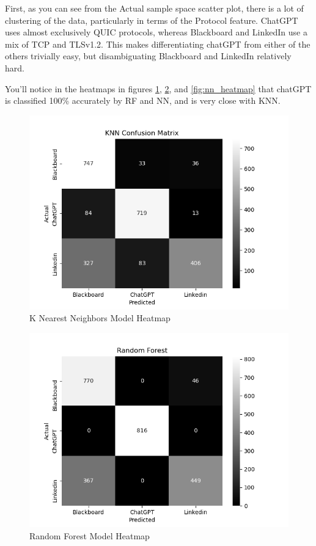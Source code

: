 \documentclass[10pt,sigconf,letterpaper,nonacm]{acmart}
\begin{document}
First, as you can see from the Actual sample space scatter plot, there is a lot of clustering of the data, particularly in terms of the Protocol feature. ChatGPT uses almost exclusively QUIC protocols, whereas Blackboard and LinkedIn use a mix of TCP and TLSv1.2. This makes differentiating chatGPT from either of the others trivially easy, but disambiguating Blackboard and LinkedIn relatively hard.

You'll notice in the heatmaps in figures \ref{fig:knn_heatmap}, \ref{fig:rf_heatmap}, and \ref{fig:nn_heatmap} that chatGPT is classified 100\% accurately by RF and NN, and is very close with KNN. 

\begin{figure}
    \centering
    \includegraphics[width=1\linewidth]{Figures_and_Graphs/ConfusionMatrixKNN.png}
    \caption{K Nearest Neighbors Model Heatmap}
    \label{fig:knn_heatmap}
\end{figure}

\begin{figure}
    \centering
    \includegraphics[width=1\linewidth]{Figures_and_Graphs/ConfusionMatrixRF.png}
    \caption{Random Forest Model Heatmap}
    \label{fig:rf_heatmap}
\end{figure}
\end{document}
